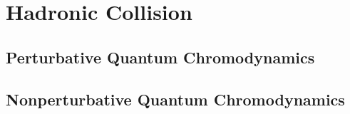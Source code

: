 \chapter{Hadronic Collision}

\section{Perturbative Quantum Chromodynamics}

\section{Nonperturbative Quantum Chromodynamics}